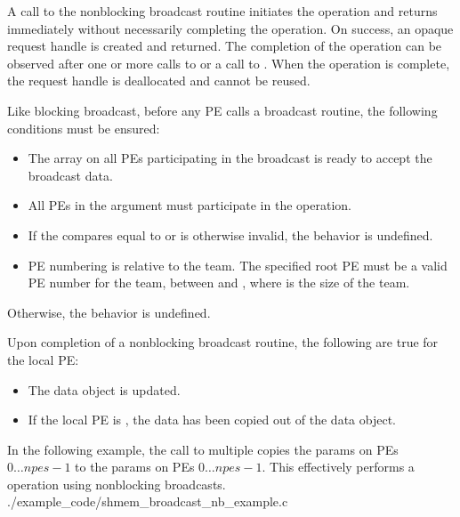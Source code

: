 \begin{apidefinition}
{    A call to the nonblocking broadcast routine initiates the operation and returns
    immediately without necessarily completing the operation. On success,
    an opaque request handle is created and returned. The completion of the
    operation can be observed after one or more calls to  or a
    call to . When the operation is complete, the request handle
    is deallocated and cannot be reused.

    Like blocking broadcast, before any \ac{PE} calls a broadcast routine, the following
    conditions must be ensured:
    \begin{itemize}
    \item The \dest{} array on all \acp{PE} participating in the broadcast
      is ready to accept the broadcast data.
    \item All \acp{PE} in the  argument must participate in
      the operation.
    \item If the  compares equal to  or is
      otherwise invalid, the behavior is undefined.
    \item \ac{PE} numbering is relative to the team. The specified
      root \ac{PE} must be a valid \ac{PE} number for the team,
      between  and , where  is the size of
      the team.
    \end{itemize}
    Otherwise, the behavior is undefined.

    Upon completion of a nonblocking broadcast routine, the following are true for the local
    \ac{PE}:
    \begin{itemize}
    \item The \dest{} data object is updated.
    \item If the local \ac{PE} is , the data has been copied
          out of the \source{} data object.
    \end{itemize}
}




\begin{apiexamples}

\apicexample
    {In the following \Cstd[11] example, the call to multiple  copies the \source{}
    params on \acp{PE} $0\dots npes-1$ to the \dest{} params on \acp{PE} $0\dots npes-1$. This effectively performs a  operation using nonblocking broadcasts.}
    {./example_code/shmem_broadcast_nb_example.c}
    {}

\end{apiexamples}

\end{apidefinition}
